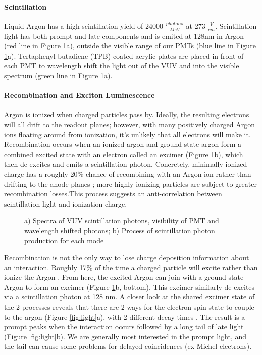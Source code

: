 \documentclass[12pt]{article}
\begin{document}
\paragraph{Scintillation}
\par Liquid Argon has a high scintillation yield of 24000 $\frac{photons}{MeV}$ at 273 $\frac{V}{cm}$.  Scintillation light has both prompt and late components and is emited at 128nm in Argon (red line in Figure \ref{fig:decay}a), outside the visible range of our PMTs (blue line in Figure \ref{fig:decay}a). Tertaphenyl butadiene (TPB) coated acrylic plates are placed in front of each PMT to wavelength shift the light out of the VUV and into the visible spectrum (green line in Figure \ref{fig:decay}a). 

\paragraph{Recombination and Exciton Luminescence}

\par Argon is ionized when charged particles pass by. Ideally, the resulting electrons will all drift to the readout planes; however, with many positively charged Argon ions floating around from ionization, it's unlikely that all electrons will make it. Recombination occurs when an ionized argon and ground state argon form a combined excited state with an electron called an excimer (Figure \ref{fig:decay}b), which then de-excites and emits a scintillation photon. Concretely, minimally ionized charge has a roughly 20\% chance of recombining with an Argon ion rather than drifting to the anode planes \cite{bib:sorel}; more highly ionizing particles are subject to greater recombination losses.This process suggests an anti-correlation between scintillation light and ionization charge.

\begin{figure}[h!]
\centering
{}
\hspace{1 mm}
\caption{ a) Spectra of VUV scintillation photons, visibility of PMT and wavelength shifted photons; b) Process of scintillation photon production for each mode  } 
\label{fig:decay}
\end{figure}


\par Recombination is not the only way to lose charge deposition information about an interaction. Roughly 17\% of the time a charged particle will excite rather than ionize the Argon \cite{bib:sorel}. From here, the excited Argon can join with a ground state Argon to form an excimer (Figure \ref{fig:decay}b, bottom). This excimer similarly de-excites via a scintillation photon at 128 nm.  A closer look at the shared excimer state of the 2 processes reveals that there are 2 ways for the electron spin state to couple to the argon (Figure \ref{fig:light}a), with 2 different decay times \cite{bib:lumin}. The result is a prompt peaks when the interaction occurs followed by a long tail of late light (Figure \ref{fig:light}b). We are generally most interested in the prompt light, and the tail can cause some problems for delayed coincidences (ex Michel electrons).
\end{document}
